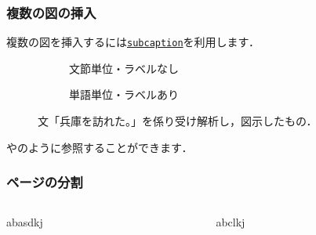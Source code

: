 \documentclass[%
  hyperref={%
    colorlinks,
    linkcolor=sDarkBlue,
    urlcolor=sDarkBlue,
    citecolor=sDarkBlue
  },
  aspectratio=169
]{beamer}
\begin{document}
    \begin{frame}
        \frametitle{複数の図の挿入}
        複数の図を挿入するには\href{https://ctan.org/pkg/subcaption}{\texttt{subcaption}}を利用します．

        \bigskip

        \begin{figure}
            \begin{subfigure}[t]{0.38\textwidth}
                \centering
                \caption{文節単位・ラベルなし}
            \end{subfigure}
            \begin{subfigure}[t]{0.6\textwidth}
                \centering
                \caption{単語単位・ラベルあり}
            \end{subfigure}
            \caption{文「兵庫を訪れた。」を係り受け解析し，図示したもの．}
        \end{figure}
        やのように参照することができます．
    \end{frame}

    \begin{frame}
        \frametitle{ページの分割}
        \begin{columns}
            \begin{column}{0.5\textwidth}
                abasdkj
            \end{column}
            \begin{column}{0.5\textwidth}
                abclkj
            \end{column}
        \end{columns}
    \end{frame}
\end{document}
